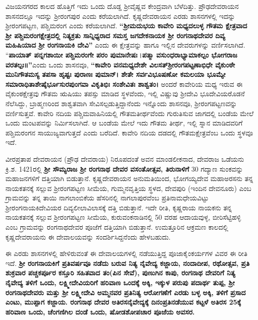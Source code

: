 ವಿಜಯನಗರದ ಕಾಲದ ಹೊತ್ತಿಗೆ ಇದು ಒಂದು ದೊಡ್ಡ ಶ‍್ರೀವೈಷ್ಣವ ಕೇಂದ್ರವಾಗಿ ಬೆಳೆದಿತ್ತು. ಪ್ರೌಢದೇವರಾಯನ ಶಾಸನದಲ್ಲೂ ಇದನ್ನು ಶ‍್ರೀರಂಗಪುರ ಎಂದು ಕರೆಯಲಾಗಿದೆ. ಕೃಷ್ಣದೇವರಾಯನ ಎರಡು ಶಾಸನಗಳಲ್ಲಿ ಇದನ್ನು ಶ‍್ರೀರಂಗಪಟ್ಟಣ, ಪಶ್ಚಿಮರಂಗ ಎಂದು ಕರೆಯಲಾಗಿದೆ. \textbf{“ಶ‍್ರೀಮದುಭಯ ಕಾವೇರಿ ಮಧ್ಯದಲುಳ್ಳ ಗೌತಮ ಕ್ಷೇತ್ರವಾದ ಶ‍್ರೀ ಪಶ್ಚಿಮರಂಗಕ್ಷೇತ್ರದಲ್ಲಿ ನಿತ್ಯಕ್ರತು ಸಾನ್ನಿಧ್ಯರಾದ ಸಮಸ್ತ ಜಗದೇಕನಾಯಕ ಶ‍್ರೀ ರಂಗನಾಥದೇವರ ದಿವ್ಯ ಮಹಿಷಿಯಾದ ಶ‍್ರೀ ರಂಗನಾಯಕಿ ದೇವಿ”} ಎಂದು ಈ ಕ್ಷೇತ್ರವನ್ನು ಹಾಗೂ ಇಲ್ಲಿನ ದೇವರುಗಳನ್ನು ವರ್ಣಿಸಲಾಗಿದೆ. “\textbf{ಪಾಯಾತ್​ ಪನ್ನಗಶಾಯೀ ಪಶ್ಚಿಮರಂಗೇ ಪರಂ ಪುಮಾನೇಷಃ}।\textbf{ಪತ್ಮಾ ವಸುಂಧರಾಭ್ಯಾಮಾಕಲ್ಪಂ ಭೋಗರಾಜ ವರತಲ್ಪಃ॥”}\break ಎಂದು ಒಂದು ಶಾಸನವೂ, \textbf{“ಕಾವೇರಿ ವನಮಧ್ಯದೇಶೇ ವಿಲಸತ್​ ಶ‍್ರೀರಂಗಪಟ್ಟಣಾಭಿಧೇ ವೈಕುಂಠೇ ಮುನಿಗೌತಮಸ್ಯ ತಪಸಾ ಹೃಷ್ಟಃ ಪುರಾಣಃ ಪುಮಾನ್​। ಶೇತೇ ಸರ್ವವಿಭೂಷಣೋ ಕಮಲಯಾ ಭೂಮ್ಯೇ ಸಮಾರಾಧಿತಾಶೇಷೈರ್ಭೂಸುರಪುಂಗವಾ ವಿಕೃತಿಭಿಃ ಸಂಶೇವಿತಃ ಶಾಶ್ವತಂ।} ಅಂದರೆ ಕಾವೇರಿಯ ಮಧ್ಯ ಇರುವ ಈ ವೈಕುಂಠಕ್ಷೇತ್ರವು ಗೌತಮ ಋಷಿಯು ತಪಸ್ಸು ಮಾಡಿದ ಸ್ಥಳವೆಂದು, ಇಲ್ಲಿ ವಿಷ್ಣುವು ಶ‍್ರೀದೇವಿ ಭೂದೇವಿಯರೊಡನೆ ನೆಲೆಸಿದ್ದು, ಬ್ರಾಹ್ಮಣರಿಂದ ಶಾಶ್ವತವಾಗಿ ಸೇವಿಸಲ್ಪಡುತ್ತಿದ್ದಾನೆಂದು ಇನ್ನೊಂದು ಶಾಸನವೂ, ಶ‍್ರೀರಂಗಪಟ್ಟಣವನ್ನು ವರ್ಣಿಸುತ್ತವೆ. ಕಾವೇರಿ ನದಿಯ ಪಶ್ಚಿಮವಾಹಿನಿಯಲ್ಲಿ ಗೌತಮತೀರ್ಥವೆಂದು ಗುರುತಿಸುವ ಜಾಗದಲ್ಲಿ ಬಂಡೆಯ ಮೇಲೆ ಒಂದು ಮಂಟಪವನ್ನು ನಿರ್ಮಿಸಲಾಗಿದೆ. ಆ ಬಂಡೆಯ ಮೇಲೆ ಇದು ಗೌತಮ ತೀರ್ಥ, ಇಲ್ಲಿ ಸ್ನಾನ ಮಾಡಿದವರಿಗೆ ಪಶ್ಚಿಮರಂಗನ ಸಾಯುಜ್ಯವಾಗುತ್ತದೆ ಎಂದು ಬರೆದಿದೆ. ಕಾವೇರಿ ನದಿಯ ದಡದಲ್ಲಿ ಗೌತಮಕ್ಷೇತ್ರವೆಂಬ ಒಂದು ಸ್ಥಳವೂ ಇದೆ.

ವೀರಪ್ರತಾಪ ದೇವರಾಯನ (ಪ್ರೌಢ ದೇವರಾಯ) ನಿರೂಪದಂತೆ ಅವನ ಮಾಂಡಲೀಕನಾದ, ದೇವರಾಜ ಒಡೆಯನು ಕ್ರಿ.ಶ. 1421ರಲ್ಲಿ \textbf{ಶ‍್ರೀ ಸೌಮ್ಯರಾಜ ಶ‍್ರೀ ರಂಗನಾಥ ದೇವರ ವಸಂತೋತ್ಸವ, ತಿರುನಾಳಿಗೆ} 30 ಗದ್ಯಾಣ ಸುಂಕವನ್ನು ಮಹಾಜನಗಳಿಗೆ ದತ್ತಿಯಾಗಿ ಬಿಡುತ್ತಾನೆ. ಕೃಷ್ಣದೇವರಾಯನ ಅನುಮತಿಯಿಂದ, ಭೋಗಯ್ಯದೇವ ಮಹಾಅರಸನು ತನ್ನ ನಾಯಕತನಕ್ಕೆ ಸಲ್ಲುವ ಶ‍್ರೀರಂಗಪಟ್ಟಣ ಸೀಮೆಯ, ಗುಮ್ಮನವೃತ್ತಿಯ ಸ್ಥಳದ, ದೇವಪುರಿ (ಇಂದಿನ ದೇವನೂರು) ಎಂಬ ಗ್ರಾಮವನ್ನು ತನ್ನ ತಾಯಿ ನಾಗಲಾಂಬಿಕೆಯ ಹೆಸರಿನಲ್ಲಿ ನಾಗಲಾಪುರ\-ವೆಂಬ ಪ್ರತಿನಾಮಧೇಯವಿಟ್ಟು ಶ‍್ರೀರಂಗನಾಯಕಿದೇವಿ\-ಯರ ದಿವ್ಯಲೀಲಾವಿಲಾಸಕ್ಕೆ ದತ್ತಿ ಬಿಡುತ್ತಾನೆ. ಇದೇ ರೀತಿ, ಕೃಷ್ಣರಾಯ ನಾಯಕನು ತನ್ನ ನಾಯಕತನಕ್ಕೆ ಸಲ್ಲುವ ಶ‍್ರೀರಂಗಪಟ್ಟಣ ಸೀಮೆಯ, ಕುರುವಂಕನಾಡಿನಲ್ಲಿ 50 ವರಹ ಆದಾಯವುಳ್ಳ, ಬೀರಿಸೆಟ್ಟಿಹಳ್ಳಿ ಎಂಬ ಗ್ರಾಮವನ್ನು ರಂಗನಾಥದೇವರ ಪೂಜೆಗೆ ದತ್ತಿಯಾಗಿ ಬಿಡುತ್ತಾನೆ. ಉಮತ್ತೂರಿನ ಆಕ್ರಮಣ ಕಾಲದಲ್ಲಿ ಕೃಷ್ಣದೇವರಾಯನು ಈ ದೇವಾಲಯವನ್ನು ಸಂದರ್ಶಿಸಿದ್ದನೆಂದು ಹೇಳಬಹುದು.

ಈ ಎರಡು ಶಾಸನಗಳಲ್ಲಿ ಹೇಳಿರುವಂತೆ ಈ ದೇವಾಲಯಗಳಲ್ಲಿ ನಡೆಯುತ್ತಿದ್ದ ಪೂಜಾಕೈಂಕರ್ಯಗಳ ವಿವರ ಈ ರೀತಿ ಇದೆ. \textbf{ಶ‍್ರೀ ರಂಗನಾಯಕಿಗೆ ಪ್ರತಿವರ್ಷವೂ ನಡೆದು ಬರುವ ನಿತ್ಯ ನೈವೇದ್ಯ ಕಜ್ಜಾಯ, ನಂದಾದೀಪ, ರಥೋತ್ಸವ, ಪ್ರತಿ ಶುಕ್ರವಾರ ಪಚ್ಚಕರ್ಪೂರ ಕಸ್ತೂರಿ ಸಹಿತವಾದ ತಂ(ಪಿನ ಸೇವೆ), ಪುಣುಗಿನ ಕಾಪು, ರಂಗನಾಥ ದೇವರಿಗೆ ನಿತ್ಯ ನೈವೇದ್ಯ ತಳಿಗೆ ಒಂದು, ಲಕ್ಷ್ಮೀದೇವಿಯರಿಗೆ ಹರಿವಾಣ ಒಂದಕ್ಕೆ ಅಕ್ಕಿ, ಇಕ್ಕುಳ ಪರುಪು ಪದಾರ್ಥ ತುಪ್ಪ, ಶ‍್ರೀ ರಂಗನಾಥದೇವರು ಮತ್ತು ಶ‍್ರೀ ಲಕ್ಷ್ಮೀದೇವಿ ಅಮ್ಮನವರ ಪ್ರತಿನಿತ್ಯ ಆರೋಗಣೆಗೆ ಎರಡು ಬಳ್ಳ ಅಕ್ಕಿ, ತಳಿಗೆ ಪ್ರಸಾದ ಎಂಟು, ಮುಪ್ಪಾಗ ಕಜ್ಜಾಯ. ರಂಗನಾಥ ದೇವರ ಅತಿರಸನೈವೇದ್ಯಕ್ಕೆ ದಿನಂಪ್ರತಿನಡೆಯುವ ಕಟ್ಟಳೆ ಅತಿರಸ 25ಕ್ಕೆ ಹರಿವಾಣ ಒಂದು, ಚೆಂಗಣಿಗಿಲ ದಂಡೆ ಒಂದು, ಷೋಡಶೋಪಚಾರ ಪೂಜೆಯ ಅವಸರ. }

